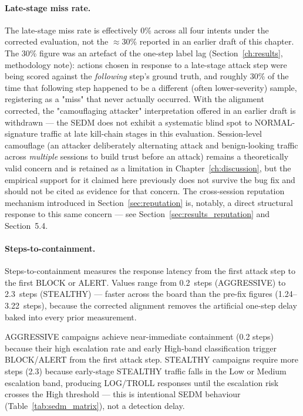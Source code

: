\paragraph{Late-stage miss rate.}
The late-stage miss rate is effectively 0\% across all four intents under
the corrected evaluation, not the $\approx$30\% reported in an earlier draft
of this chapter. The 30\% figure was an artefact of the one-step label lag
(Section~\ref{ch:results}, methodology note): actions chosen in response to a
late-stage attack step were being scored against the \emph{following} step's
ground truth, and roughly 30\% of the time that following step happened to
be a different (often lower-severity) sample, registering as a "miss" that
never actually occurred. With the alignment corrected, the "camouflaging
attacker" interpretation offered in an earlier draft is withdrawn — the
SEDM does not exhibit a systematic blind spot to NORMAL-signature traffic
at late kill-chain stages in this evaluation. Session-level camouflage
(an attacker deliberately alternating attack and benign-looking traffic
across \emph{multiple} sessions to build trust before an attack) remains a
theoretically valid concern and is retained as a limitation in
Chapter~\ref{ch:discussion}, but the empirical support for it claimed here
previously does not survive the bug fix and should not be cited as evidence
for that concern. The cross-session reputation mechanism introduced in
Section~\ref{sec:reputation} is, notably, a direct structural response to
this same concern — see Section~\ref{sec:results_reputation} and
Section~5.4.

\paragraph{Steps-to-containment.}
Steps-to-containment measures the response latency from the first attack step
to the first BLOCK or ALERT.
Values range from 0.2~steps (AGGRESSIVE) to 2.3~steps (STEALTHY) — faster
across the board than the pre-fix figures (1.24--3.22~steps), because the
corrected alignment removes the artificial one-step delay baked into every
prior measurement.

AGGRESSIVE campaigns achieve near-immediate containment (0.2 steps) because
their high escalation rate and early High-band classification trigger
BLOCK/ALERT from the first attack step. STEALTHY campaigns require more
steps (2.3) because early-stage STEALTHY traffic falls in the Low or Medium
escalation band, producing LOG/TROLL responses until the escalation risk
crosses the High threshold — this is intentional SEDM behaviour
(Table~\ref{tab:sedm_matrix}), not a detection delay.


